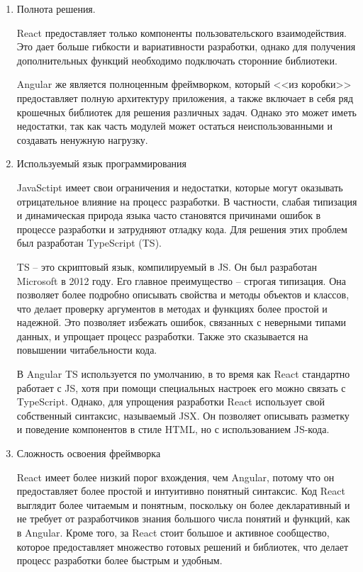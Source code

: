 \begin{enumerate}
    \item Полнота решения.

    React предоставляет только компоненты пользовательского взаимодействия. Это дает больше гибкости и вариативности разработки, однако для получения дополнительных функций необходимо подключать сторонние библиотеки.
    
    Angular же является полноценным фреймворком, который <<из коробки>> предоставляет полную архитектуру приложения, а также включает в себя ряд крошечных библиотек для решения различных задач. Однако это может иметь недостатки, так как часть модулей может остаться неиспользованными и создавать ненужную нагрузку.

    \item Используемый язык программирования
    
    JavaSctipt имеет свои ограничения и недостатки, которые могут оказывать отрицательное влияние на процесс разработки. В частности, слабая типизация и динамическая природа языка часто становятся причинами ошибок в процессе разработки и затрудняют отладку кода. Для решения этих проблем был разработан TypeScript (TS).

    TS -- это скриптовый язык, компилируемый в JS. Он  был разработан Microsoft в 2012 году. Его главное преимущество -- строгая типизация. Она позволяет более подробно описывать свойства и методы объектов и классов, что делает проверку аргументов в методах и функциях более простой и надежной. Это позволяет избежать ошибок, связанных с неверными типами данных, и упрощает процесс разработки. Также это сказывается на повышении читабельности кода. 

    В Angular TS используется по умолчанию, в то время как React стандартно работает с JS, хотя при помощи специальных настроек его можно связать с TypeScript. Однако, для упрощения разработки React использует свой собственный синтаксис, называемый JSX. Он позволяет описывать разметку и поведение компонентов в стиле HTML, но с использованием JS-кода.

    \item Сложность освоения фреймворка

     React имеет более низкий порог вхождения, чем Angular, потому что он предоставляет более простой и интуитивно понятный синтаксис. Код React выглядит более читаемым и понятным, поскольку он более декларативный и не требует от разработчиков знания большого числа понятий и функций, как в Angular. Кроме того, за React стоит большое и активное сообщество, которое предоставляет множество готовых решений и библиотек, что делает процесс разработки более быстрым и удобным. 


\end{enumerate}
